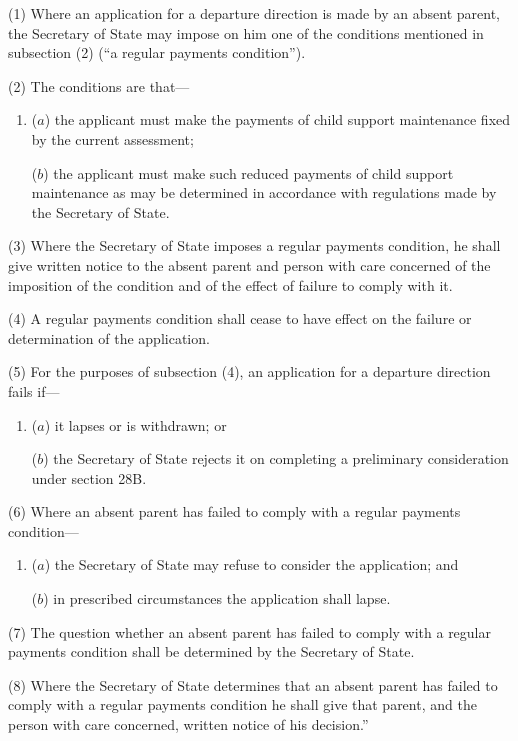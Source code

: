 \documentclass[12pt,a4paper]{article}
\begin{document}
(1) Where an application for a departure direction is made by an absent parent, the Secretary of State may impose on him one of the conditions mentioned in subsection (2) (“a regular payments condition”).

(2) The conditions are that—
\begin{enumerate}\item[]
($a$) the applicant must make the payments of child support maintenance fixed by the current assessment;

($b$) the applicant must make such reduced payments of child support maintenance as may be determined in accordance with regulations made by the Secretary of State.
\end{enumerate}

(3) Where the Secretary of State imposes a regular payments condition, he shall give written notice to the absent parent and person with care concerned of the imposition of the condition and of the effect of failure to comply with it.

(4) A regular payments condition shall cease to have effect on the failure or determination of the application.

(5) For the purposes of subsection (4), an application for a departure direction fails if—
\begin{enumerate}\item[]
($a$) it lapses or is withdrawn; or

($b$) the Secretary of State rejects it on completing a preliminary consideration under section 28B.
\end{enumerate}

(6) Where an absent parent has failed to comply with a regular payments condition—
\begin{enumerate}\item[]
($a$) the Secretary of State may refuse to consider the application; and

($b$) in prescribed circumstances the application shall lapse.
\end{enumerate}

(7) The question whether an absent parent has failed to comply with a regular payments condition shall be determined by the Secretary of State.

(8) Where the Secretary of State determines that an absent parent has failed to comply with a regular payments condition he shall give that parent, and the person with care concerned, written notice of his decision.”

\end{document}
